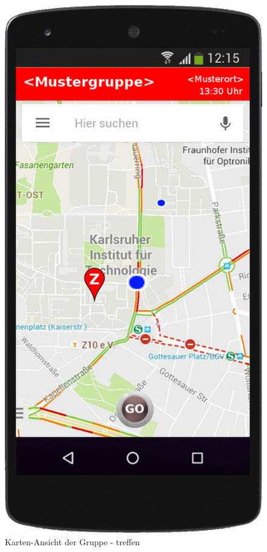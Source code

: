 \begin{figure}
	\caption{Karten-Ansicht der Gruppe - treffen}
	\includegraphics[scale =0.2]{resources/images/handy/map_go.png}
\end{figure}
